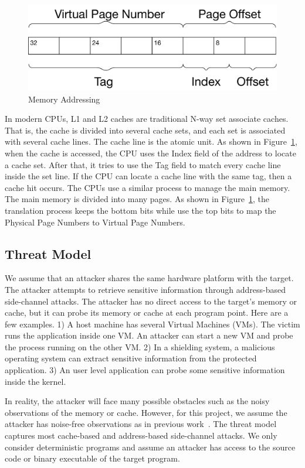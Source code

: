 \begin{figure}
    \centering
    \includegraphics[width=.65\columnwidth]{./figures/chapter3/address.pdf}
    \caption{Memory Addressing}\label{fig:memory_address}
\end{figure}

In modern CPUs, L1 and L2 caches are traditional N-way set associate caches. That is, the cache is divided into several cache sets, and each set is associated with several cache lines. The cache line is the atomic unit. As shown in Figure~\ref{fig:memory_address}, when the cache is accessed, the CPU uses the \textsf{Index} field of the address to locate a cache set. After that, it tries to use the \textsf{Tag} field to match every cache line inside the set line. If the CPU can locate a cache line with the same tag, then a cache hit occurs. The CPUs use a similar process to manage the main memory. The main memory is divided into many pages. As shown in Figure~\ref{fig:memory_address}, 
the translation process keeps the bottom bits while use the top bits to map the Physical Page Numbers to Virtual Page Numbers.

\subsection{Threat Model}
We assume that an attacker shares the same hardware platform with the target.
The attacker attempts to retrieve sensitive information through address-based
side-channel attacks. The attacker has no direct access to the target's memory or cache,
but it can probe its memory or cache at each program point. 
Here are a few examples. 1) A host machine has several Virtual Machines (VMs). The victim runs the application inside one VM. An attacker can start a new VM and probe the process running on the other VM.  2) In a shielding system, a malicious operating system can extract sensitive information from the protected application. 3) An user level application can probe some sensitive information inside the kernel.

In reality, the
attacker will face many possible obstacles such as the noisy observations 
of the memory or cache. However, for this project, we assume
the attacker has noise-free observations as in previous work~\cite{203878,182946,Brotzman19Casym}. 
The threat model captures most cache-based and address-based side-channel attacks. 
We only consider deterministic programs and assume an attacker 
has access to the source code or binary executable of the target program.



